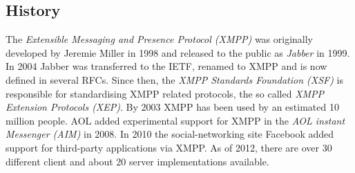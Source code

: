 \subsection{History}
The \textit{Extensible Messaging and Presence Protocol (XMPP)}
was originally developed by Jeremie Miller in 1998 and released
to the public as \textit{Jabber} in 1999. In 2004 Jabber
was transferred to the IETF, renamed to XMPP
and is now defined in several
RFCs\cite{rfc3920,rfc3921,rfc3922,rfc3923,rfc4622,rfc4854,rfc4979,rfc6120,rfc6121}.
Since then, the \textit{XMPP Standards Foundation (XSF)} is responsible
for standardising XMPP related protocols, the so called 
\textit{XMPP Extension Protocols (XEP)}.
By 2003 XMPP has been used by an estimated 10 million people\cite{xmppuser}.
AOL added experimental support for XMPP in the 
\textit{AOL instant Messenger (AIM)} in 2008.
In 2010 the social-networking site Facebook added support for
third-party applications via XMPP.
As of 2012, there are over 30 different client and about 20
server implementations available.
